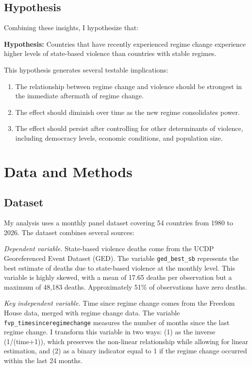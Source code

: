 \documentclass[12pt]{article}
\begin{document}
\subsection{Hypothesis}

Combining these insights, I hypothesize that:

\textbf{Hypothesis:} Countries that have recently experienced regime change experience higher levels of state-based violence than countries with stable regimes.

This hypothesis generates several testable implications:
\begin{enumerate}
    \item The relationship between regime change and violence should be strongest in the immediate aftermath of regime change.
    \item The effect should diminish over time as the new regime consolidates power.
    \item The effect should persist after controlling for other determinants of violence, including democracy levels, economic conditions, and population size.
\end{enumerate}

\section{Data and Methods}

\subsection{Dataset}

My analysis uses a monthly panel dataset covering 54 countries from 1980 to 2026. The dataset combines several sources:

\textit{Dependent variable.} State-based violence deaths come from the UCDP Georeferenced Event Dataset (GED). The variable \texttt{ged\_best\_sb} represents the best estimate of deaths due to state-based violence at the monthly level. This variable is highly skewed, with a mean of 17.65 deaths per observation but a maximum of 48,183 deaths. Approximately 51\% of observations have zero deaths.

\textit{Key independent variable.} Time since regime change comes from the Freedom House data, merged with regime change data. The variable \texttt{fvp\_timesinceregimechange} measures the number of months since the last regime change. I transform this variable in two ways: (1) as the inverse (1/(time+1)), which preserves the non-linear relationship while allowing for linear estimation, and (2) as a binary indicator equal to 1 if the regime change occurred within the last 24 months.
\end{document}
